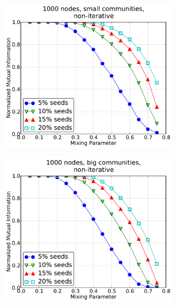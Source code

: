 \begin{figure}[h!]
    \centering
    \begin{subfigure}{0.5\textwidth}
    \centering
    \includegraphics[width=\appplotwidth]{plots/nonoverlap_noniter_a.pdf}
    \end{subfigure}%
    \begin{subfigure}{0.5\textwidth}
    \centering
    \includegraphics[width=\appplotwidth]{plots/nonoverlap_noniter_b.pdf}
    \end{subfigure}

\end{figure}
